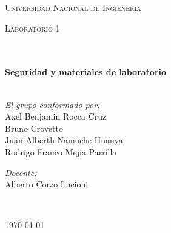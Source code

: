 \begin{center}
	\vspace*{1.0cm}								%
	\textsc{\huge Universidad Nacional de Ingieneria }\\[1.5cm]


	\begin{minipage}{0.9\textwidth}
		\begin{center}																					%
			\textsc{\LARGE Laboratorio 1 }
		\end{center}
	\end{minipage}\\[0.5cm]
	\vspace*{1cm}																		%
	\HRule \\[0.4cm]																	%
	{ \huge \bfseries Seguridad y materiales de laboratorio }\\[0.4cm]	%
	\HRule \\[1.5cm]																	%
	\begin{minipage}{0.46\textwidth}													%
		\begin{flushleft} \large															%

			\emph{El grupo conformado por:}\\
			Axel Benjamin Rocca Cruz\\
			Bruno Crovetto                                         \\
			Juan Alberth Namuche Huauya             \\
			Rodrigo Franco Mejia Parrilla                

		\end{flushleft}																		%
	\end{minipage}
	\begin{minipage}{0.52\textwidth}
		\vspace{-0.6cm}											%
		\begin{flushright} \large															%
			\emph{Docente:} \\																	%
			Alberto Corzo Lucioni 
		\end{flushright}																	%
	\end{minipage}
	\vspace*{1cm}

	\\																		%
	\vspace{2cm}
	\begin{center}
		{\large \today}																	%
	\end{center}
\end{center}

\newpage
